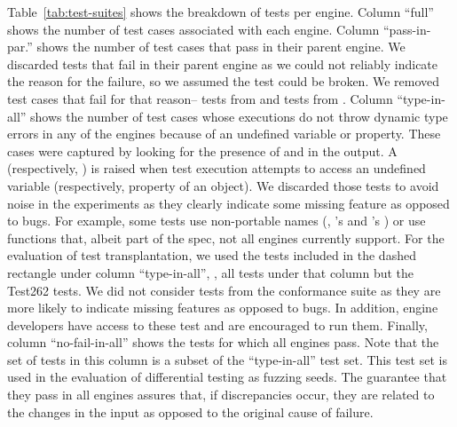 \documentclass[smallextended]{svjour3}
\begin{document}
Table~\ref{tab:test-suites} shows the breakdown of tests per
engine. Column ``full'' shows the number of test cases associated with
each engine. Column ``pass-in-par.''  shows the number of test cases
that pass in their parent engine. We discarded tests that fail in
their parent engine as we could not reliably indicate the reason for
the failure, so we assumed the test could be broken. We removed \testsThatFail{}
test cases that fail for that reason--\testsThatFailJSC{} tests from \jsc{} and
\testsThatFailSM{} tests from \smonkey. Column ``type-in-all''
shows the number of test cases whose executions do not throw
dynamic type errors in any of the engines because of an undefined variable or property.
These cases were captured by looking for the presence of  and
 in the output. A 
(respectively, ) is raised when test execution
attempts to access an undefined variable (respectively, property of an
object). We discarded those tests to avoid noise in the experiments as
they clearly indicate some missing feature as opposed to bugs. For
example, some tests use non-portable names (\eg{}, \jsc{}'s
 and \smonkey{}'s )
or use functions that, albeit part of the spec, not all engines
currently support. For the evaluation of test transplantation, we used
the \totalTestFilesForTestTransplantation{} tests included in the
dashed rectangle under column ``type-in-all'', \ie{}, all tests under
that column but the Test262 tests. We did not consider tests from the
conformance suite as they are more likely to indicate missing features
as opposed to bugs. In addition, engine developers have access to
these test and are encouraged to run them. Finally, column
``no-fail-in-all'' shows the tests for which all engines pass. Note
that the set of tests in this column is a subset of the
``type-in-all'' test set. This test set is used in the evaluation of
differential testing as fuzzing seeds. The guarantee that they pass in
all engines assures that, if discrepancies occur, they are related to
the changes in the input as opposed to the original cause of failure.

\newcommand\marktopleft[1]{%
    \tikz[overlay,remember picture]
        \node (marker-#1-a) at (0,2ex) {};%
}
\newcommand\markbottomright[1]{%
    \tikz[overlay,remember picture]
        \node (marker-#1-b) at (0,0) {};%
    \tikz[overlay,remember picture,thick,dashed,inner sep=2pt]
        \node[draw,rectangle,fit=(marker-#1-a.center) (marker-#1-b.center)] {};%
}
\end{document}
